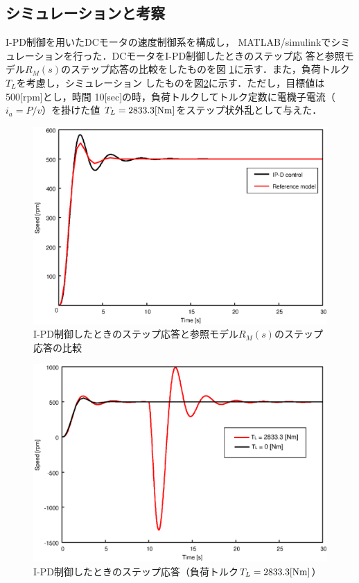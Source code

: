 \documentclass[a4paper,12pt]{jarticle}
\begin{document}
\subsection{シミュレーションと考察}
I-PD制御を用いたDCモータの速度制御系を構成し，
MATLAB/simulinkでシミュレーションを行った．DCモータをI-PD制御したときのステップ応
答と参照モデル$R_M(s)$のステップ応答の比較をしたものを図
\ref{fig:IPD_com}に示す．また，負荷トルク$T_L$を考慮し，シミュレーション
したものを図\ref{fig:IPD_TL}に示す．ただし，目標値は500[rpm]とし，時間
10[sec]の時，負荷トルクしてトルク定数に電機子電流（$i_a = P/v$）を掛けた値
$T_L=2833.3[\rm{Nm}]$をステップ状外乱として与えた\cite{mecha}．
%
\begin{figure}[htbp]
 \begin{center}
  \includegraphics[width = 150mm]{fig/IPD_com.eps}
 \end{center}
 \caption{I-PD制御したときのステップ応答と参照モデル$R_M(s)$のステップ応答の比較}
 \label{fig:IPD_com}
\end{figure}
%
%
\begin{figure}[tbp]
 \begin{center}
  \includegraphics[width = 150mm]{fig/IPD_TL.eps}
 \end{center}
 \caption{I-PD制御したときのステップ応答（負荷トルク$T_L=2833.3[\rm{Nm}]$）}
 \label{fig:IPD_TL}
\end{figure}
\end{document}
